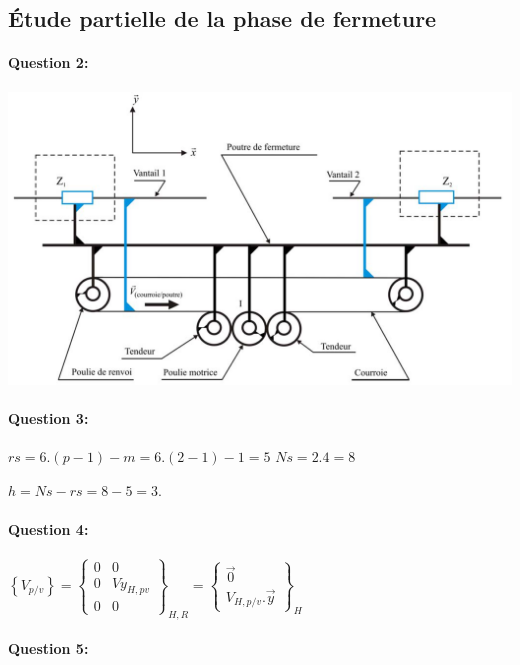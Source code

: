 \subsection{Étude partielle de la phase de fermeture}

\paragraph{Question 2:}

\begin{center}
 \includegraphics[width=\linewidth]{img/DR2_cor}
\end{center}

\paragraph{Question 3:}

$rs=6.(p-1)-m=6.(2-1)-1=5$
$Ns=2.4=8$

$h=Ns-rs=8-5=3$.

\paragraph{Question 4:}

$\left\{V_{p/v}\right\}=\left\{
\begin{matrix}
 0 & 0 \\
 0 & Vy_{H,pv} \\
 0 & 0 
\end{matrix}
\right \}_{H,R}=\left \{
\begin{matrix}
 \overrightarrow{0} \\ 
 V_{H,p/v}.\overrightarrow{y} 
\end{matrix}
\right\}_H$


\paragraph{Question 5:}

